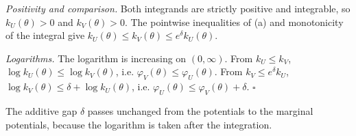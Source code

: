 \documentclass[11pt,a4paper]{article}
\begin{document}
\emph{Positivity and comparison.} Both integrands are strictly positive and integrable, so \(k_U(\theta)>0\) and \(k_V(\theta)>0\). The pointwise inequalities of (a) and monotonicity of the integral give \(k_U(\theta)\le k_V(\theta)\le e^\delta k_U(\theta)\).




\emph{Logarithms.} The logarithm is increasing on \((0,\infty)\). From \(k_U\le k_V\), \(\log k_U(\theta)\le\log k_V(\theta)\), i.e. \(\varphi_V(\theta)\le\varphi_U(\theta)\). From \(k_V\le e^\delta k_U\), \(\log k_V(\theta)\le\delta+\log k_U(\theta)\), i.e. \(\varphi_U(\theta)\le\varphi_V(\theta)+\delta\). \(\square\)




The additive gap \(\delta\) passes unchanged from the potentials to the marginal potentials, because the logarithm is taken after the integration.
\end{document}
